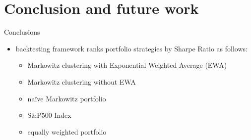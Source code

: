 \documentclass[dvipsnames,mathserif]{beamer}
\begin{document}
\section[Conclusion]{Conclusion and future work}

\begin{frame}{Conclusions}
   
\vfill

\begin{itemize}
    \item  backtesting framework ranks portfolio strategies by Sharpe Ratio as follows:
        \begin{itemize}
            \item Markowitz clustering with Exponential Weighted Average (EWA)
            \item Markowitz clustering without EWA
            \item naïve Markowitz portfolio
            \item S\&P500 Index
            \item equally weighted portfolio
        \end{itemize}
        

\end{itemize}
\end{frame}
\end{document}
